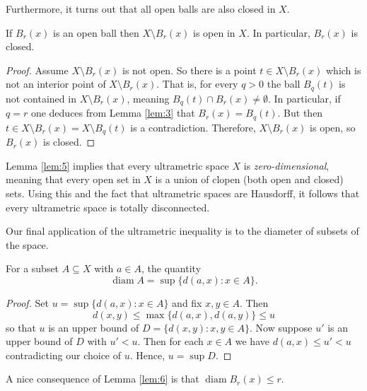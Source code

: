 Furthermore, it turns out that all open balls are also closed in \( X \).
\begin{lemma}
\label{lem:5}
If \( B_{r } (x) \) is an open ball then \( X \setminus B_{r} (x) \) is open in \( X \). In particular, \( B_{r} (x) \) is closed.
\end{lemma}
\begin{proof}
Assume \( X \setminus B_{r} (x) \) is not open. So there is a point \( t \in X \setminus B_{r} (x) \) which is not an interior point of \( X \setminus B_{r} (x) \). That is, for every \( q > 0 \) the ball \( B_{q} (t) \) is not contained in \( X \setminus B_{r} (x) \), meaning \( B_{q} (t) \cap B_{r} (x) \neq \emptyset \). In particular, if \( q = r \) one deduces from Lemma \ref{lem:3} that \( B_{r} (x) = B_{q} (t) \). But then \( t \in X \setminus B_{r} (x) = X \setminus B_{q} (t) \) is a contradiction. Therefore, \( X \setminus B_{r} (x) \) is open, so \( B_{r} (x) \) is closed.
\end{proof}

Lemma \ref{lem:5} implies that every ultrametric space \( X \) is \emph{zero-dimensional}, meaning that every open set in \( X \) is a union of clopen (both open and closed) sets. Using this and the fact that ultrametric spaces are Hausdorff, it follows that every ultrametric space is totally disconnected.

Our final application of the ultrametric inequality is to the diameter of subsets of the space.
\begin{lemma}
\label{lem:6}
For a subset \( A \subseteq X \) with \( a \in A \), the quantity \[ \operatorname{diam} A = \sup \{ d(a,x) : x \in A \}. \]
\end{lemma}
\begin{proof}
Set \( u = \sup \{ d(a,x) : x \in A \} \) and fix \( x,y \in A \). Then \[ d(x,y) \leq \max \{ d(a,x), d(a,y) \} \leq u \] so that \( u \) is an upper bound of \( D = \{ d(x,y) : x,y \in A \} \). Now suppose \( u' \) is an upper bound of \( D \) with \( u' < u \). Then for each \( x \in A \) we have \( d(a,x) \leq u' < u \) contradicting our choice of \( u \). Hence, \( u = \sup D \).
\end{proof}

A nice consequence of Lemma \ref{lem:6} is that \( \operatorname{diam} B_{r} (x) \leq r \).
